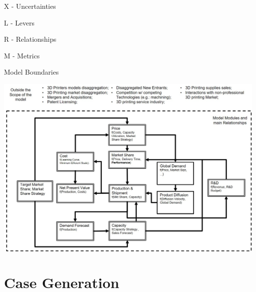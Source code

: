 \documentclass[12pt,ignorenonframetext,]{beamer}
\begin{document}
\begin{frame}{X - Uncertainties}

\end{frame}

\begin{frame}{L - Levers}

\end{frame}

\begin{frame}{R - Relationships}

\end{frame}

\begin{frame}{M - Metrics}

\end{frame}

\begin{frame}{Model Boundaries}

\includegraphics{images/model-modules-and-boundaries.jpg}

\end{frame}

\section{Case Generation}\label{case-generation}
\end{document}
